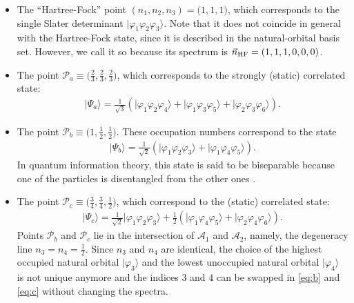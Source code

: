 \documentclass[aps,twocolumn,showpacs,pra,superscriptaddress,floatfix,longbibliography]{revtex4-1}
\newcommand{\7}{\dagger}
\newcommand{\ket}[1]{\mbox{$| #1 \rangle$}}
\newcommand{\half}{\tfrac{1}{2}}      %
\begin{document}
\begin{itemize}

\item The ``Hartree-Fock'' point 
$(n_1,n_2,n_3) = \bigl(1,1,1\bigr)$, which 
corresponds to the single Slater determinant
$\ket{\varphi_1\varphi_2\varphi_3}$.
Note that it does not coincide in general with
the Hartree-Fock state, since it is described in the 
natural-orbital basis set. However, we call it so 
because its spectrum is
$\vec{n}_{\rm HF} = (1,1,1,0,0,0)$.

\item The point 
$\mathcal{P}_a \equiv  \bigl(\tfrac23,\tfrac23,\tfrac23\bigr)$,
which corresponds to the strongly (static) correlated state: 
\begin{align}
\label{eq:a}
\ket{\Psi_a} =
\tfrac1{\sqrt{3}}  (\ket{\varphi_1\varphi_2\varphi_4} 
+ \ket{\varphi_1\varphi_3\varphi_5} 
+ \ket{\varphi_2\varphi_3\varphi_6}).
\end{align} 

\item The point $\mathcal{P}_b \equiv   \bigl(1,\tfrac12,\tfrac12\bigr)$.
These occupation numbers correspond to the state
\begin{align}
\label{eq:b}
\ket{\Psi_b} = \tfrac1{\sqrt{2}} (\ket{\varphi_1\varphi_2\varphi_3} 
+ \ket{\varphi_1\varphi_4\varphi_5}).
\end{align} 
In quantum information theory, this state is said to be 
 biseparable because one of the particles is disentangled 
 from the other ones \cite{Vrana2008}. 

\item The point $\mathcal{P}_c \equiv  
\bigl(\tfrac34,\tfrac34,\tfrac12\bigr)$,
which correspond to the (static) correlated state:
\begin{align}
\label{eq:c}
\ket{\Psi_c} = 
\tfrac1{\sqrt{2}} \ket{\varphi_1\varphi_2\varphi_3} +
\tfrac12
 (\ket{\varphi_1\varphi_4\varphi_5} 
+ \ket{\varphi_2\varphi_4\varphi_6}).
\end{align} 
Points $\mathcal{P}_b$ and $\mathcal{P}_c$ lie in the 
intersection of $\mathcal{A}_1$ and $\mathcal{A}_2$,
namely, the degeneracy line $n_3 = n_4 = \half$. 
Since $n_3$ and $n_4$ are identical, the choice of the 
highest occupied natural orbital $\ket{\varphi_3}$ and the 
lowest unoccupied natural orbital $\ket{\varphi_4}$ is not 
unique anymore and the indices $3$ and $4$ can be 
swapped in \eqref{eq:b} and \eqref{eq:c} without
changing the spectra.

\end{itemize}
 
\end{document}

